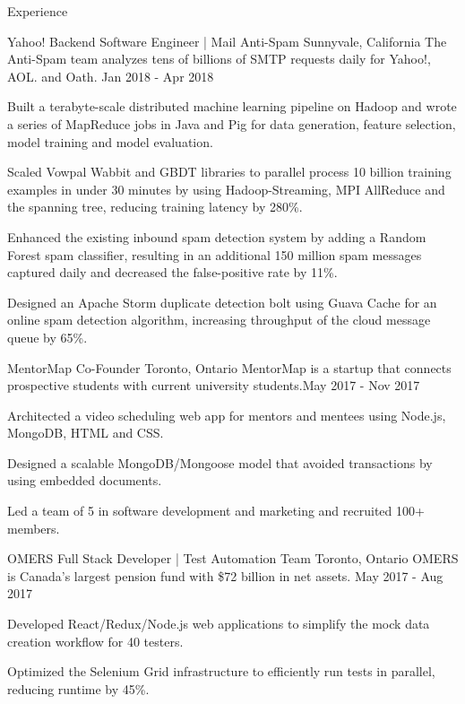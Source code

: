 \documentclass{resume} %
\begin{document}
\begin{rSection}{Experience}

\begin{expSec}
{Yahoo!}
{Backend Software Engineer | Mail Anti-Spam}
{Sunnyvale, California}
{The Anti-Spam team analyzes tens of billions of SMTP requests daily for Yahoo!, AOL. and Oath.}
{Jan 2018 - Apr 2018}
\item Built a terabyte-scale distributed machine learning pipeline on Hadoop and wrote a series of MapReduce jobs in Java and Pig for data generation, feature selection, model training and model evaluation.
\item Scaled Vowpal Wabbit and GBDT libraries to parallel process 10 billion training examples in under 30 minutes by using Hadoop-Streaming, MPI AllReduce and the spanning tree, reducing training latency by 280\%.
\item Enhanced the existing inbound spam detection system by adding a Random Forest spam classifier, resulting in an additional 150 million spam messages captured daily and decreased the false-positive rate by 11\%.
\item Designed an Apache Storm duplicate detection bolt using Guava Cache for an online spam detection algorithm, increasing throughput of the cloud message queue by 65\%.

\end{expSec}

\begin{expSec}
{MentorMap}
{Co-Founder \href{https://www.mentormap.ca/}{\space\small\faExternalLink}}
{Toronto, Ontario}
{MentorMap is a startup that connects prospective students with current university students.}{May 2017 - Nov 2017}
\item Architected a video scheduling web app for mentors and mentees using Node.js, MongoDB, HTML and CSS.
\item Designed a scalable MongoDB/Mongoose model that avoided transactions by using embedded documents.
\item Led a team of 5 in software development and marketing and recruited 100+ members.
\end{expSec}

\begin{expSec}
{OMERS}
{Full Stack Developer | Test Automation Team}
{Toronto, Ontario}
{OMERS is Canada's largest pension fund with \$72 billion in net assets.}
{May 2017 - Aug 2017}
\item Developed React/Redux/Node.js web applications to simplify the mock data creation workflow for 40 testers.
\item Optimized the Selenium Grid infrastructure to efficiently run tests in parallel, reducing runtime by 45\%. \end{expSec}

\end{rSection}
\end{document}

